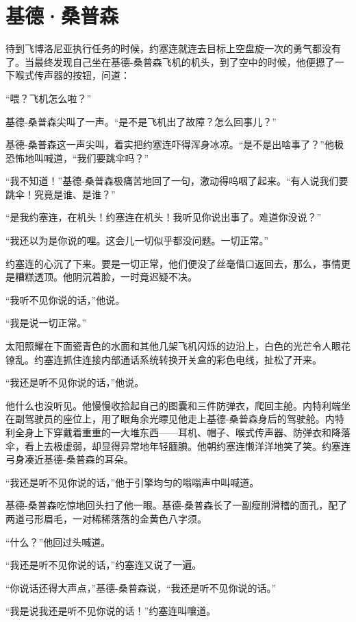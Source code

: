 \chapter{基德·桑普森}
 
    待到飞博洛尼亚执行任务的时候，约塞连就连去目标上空盘旋一次的勇气都没有了。当最终发现自己坐在基德-桑普森飞机的机头，到了空中的时候，他便摁了一下喉式传声器的按钮，问道：

    “喂？飞机怎么啦？”

    基德-桑普森尖叫了一声。“是不是飞机出了故障？怎么回事儿？”

    基德-桑普森这一声尖叫，着实把约塞连吓得浑身冰凉。“是不是出啥事了？”他极恐怖地叫喊道，“我们要跳伞吗？”

    “我不知道！”基德-桑普森极痛苦地回了一句，激动得呜咽了起来。“有人说我们要跳伞！究竟是谁、是谁？”

    “是我约塞连，在机头！约塞连在机头！我听见你说出事了。难道你没说？”

    “我还以为是你说的哩。这会儿一切似乎都没问题。一切正常。”

    约塞连的心沉了下来。要是一切正常，他们便没了丝毫借口返回去，那么，事情更是糟糕透顶。他阴沉着脸，一时竟迟疑不决。

    “我听不见你说的话，”他说。

    “我是说一切正常。”

    太阳照耀在下面瓷青色的水面和其他几架飞机闪烁的边沿上，白色的光芒令人眼花镣乱。约塞连抓住连接内部通话系统转换开关盒的彩色电线，扯松了开来。

    “我还是听不见你说的话，”他说。

    他什么也没听见。他慢慢收拾起自己的图囊和三件防弹衣，爬回主舱。内特利端坐在副驾驶员的座位上，用了眼角余光瞟见他走上基德-桑普森身后的驾驶舱。内特利全身上下穿戴着重重的一大堆东西——耳机、帽子、喉式传声器、防弹衣和降落伞，看上去极虚弱，却显得异常地年轻腼腆。他朝约塞连懒洋洋地笑了笑。约塞连弓身凑近基德-桑普森的耳朵。

    “我还是听不见你说的话，”他于引擎均匀的嗡嗡声中叫喊道。

    基德-桑普森吃惊地回头扫了他一眼。基德-桑普森长了一副瘦削滑稽的面孔，配了两道弓形眉毛，一对稀稀落落的金黄色八字须。

    “什么？”他回过头喊道。

    “我还是听不见你说的话，”约塞连又说了一遍。

    “你说话还得大声点，”基德-桑普森说，“我还是听不见你说的话。”

    “我是说我还是听不见你说的话！”约塞连叫嚷道。

